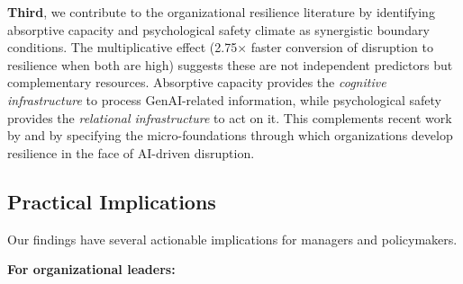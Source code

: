 \documentclass[12pt, a4paper]{article}
\begin{document}
\textbf{Third}, we contribute to the organizational resilience literature by identifying absorptive capacity and psychological safety climate as synergistic boundary conditions. The multiplicative effect (2.75$\times$ faster conversion of disruption to resilience when both are high) suggests these are not independent predictors but complementary resources. Absorptive capacity provides the \textit{cognitive infrastructure} to process GenAI-related information, while psychological safety provides the \textit{relational infrastructure} to act on it. This complements recent work by \citet{Duchek2020} and \citet{Zeng2025} by specifying the micro-foundations through which organizations develop resilience in the face of AI-driven disruption.

\subsection{Practical Implications}

Our findings have several actionable implications for managers and policymakers.

\textbf{For organizational leaders:}
\end{document}

